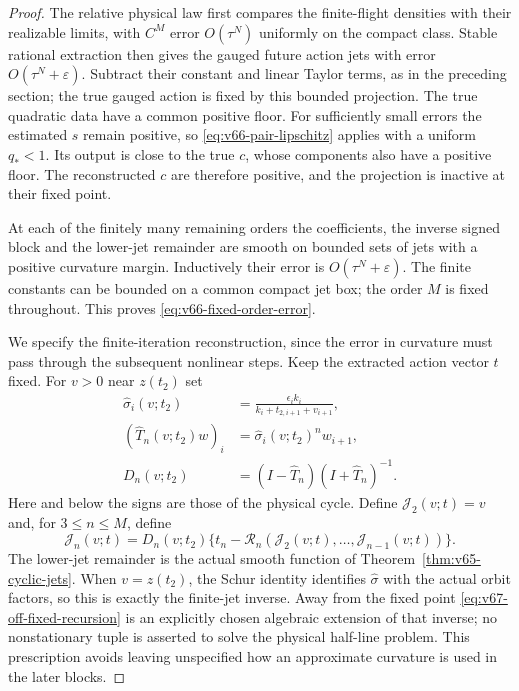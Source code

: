 \begin{proof}
The relative physical law first compares the finite-flight densities
with their realizable limits, with $C^M$ error $O(\tau^N)$ uniformly
on the compact class.  Stable rational extraction then gives the gauged
future action jets with error $O(\tau^N+\varepsilon)$.  Subtract their
constant and linear Taylor terms, as in the preceding section; the true
gauged action is fixed by this bounded projection.  The true quadratic
data have a common positive floor.  For sufficiently small errors the
estimated $s$ remain positive, so \eqref{eq:v66-pair-lipschitz} applies
with a uniform $q_*<1$.  Its output is close to the true $c$, whose
components also have a positive floor.  The reconstructed $c$ are
therefore positive, and the projection is inactive at their fixed point.

At each of the finitely many remaining orders the coefficients, the
inverse signed block and the lower-jet remainder are smooth on bounded
sets of jets with a positive curvature margin.  Inductively their error
is $O(\tau^N+\varepsilon)$.  The finite constants can be bounded on
a common compact jet box; the order $M$ is fixed throughout.  This proves
\eqref{eq:v66-fixed-order-error}.

We specify the finite-iteration reconstruction, since the error in
curvature must pass through the subsequent nonlinear steps.  Keep the
extracted action vector $t$ fixed.  For $v>0$ near $z(t_2)$ set
\begin{equation}\label{eq:v67-off-fixed-block}
 \begin{split}
 \widehat\sigma_i(v;t_2)&=
      \frac{\epsilon_i k_i}{k_i+t_{2,i+1}+v_{i+1}},\\
 (\widehat T_n(v;t_2)w)_i&=
                         \widehat\sigma_i(v;t_2)^n w_{i+1},\\
 D_n(v;t_2)&=(I-\widehat T_n)(I+\widehat T_n)^{-1}.
 \end{split}
\end{equation}
Here and below the signs are those of the physical cycle.  Define
$\mathcal J_2(v;t)=v$ and, for $3\le n\le M$, define
\begin{equation}\label{eq:v67-off-fixed-recursion}
 \mathcal J_n(v;t)=D_n(v;t_2)
  \{t_n-\mathcal R_n(\mathcal J_2(v;t),\ldots,
                                      \mathcal J_{n-1}(v;t))\}.
\end{equation}
The lower-jet remainder is the actual smooth function of
Theorem~\ref{thm:v65-cyclic-jets}.  When $v=z(t_2)$, the Schur
identity identifies $\widehat\sigma$ with the actual orbit factors,
so this is exactly the finite-jet inverse.  Away from the fixed point
\eqref{eq:v67-off-fixed-recursion} is an explicitly chosen algebraic
extension of that inverse; no nonstationary tuple is asserted to solve
the physical half-line problem.  This prescription avoids leaving
unspecified how an approximate curvature is used in the later blocks.


\end{proof}
